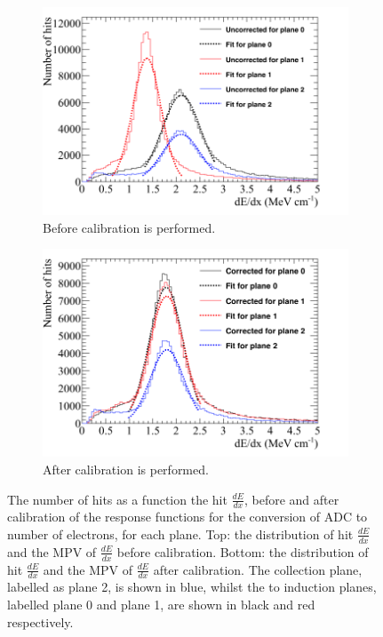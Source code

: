 \begin{figure}
  \centering
  \begin{subfigure}{0.6\textwidth}
    \centering
    \includegraphics[width=\textwidth]{UnCorrectedCanvas}
    \caption{Before calibration is performed.}
    \label{fig:CaloTune_Before}
  \end{subfigure}
  \begin{subfigure}{0.6\textwidth}
    \centering
    \includegraphics[width=\textwidth]{CorrectedCanvas}
    \caption{After calibration is performed.}
    \label{fig:CaloTune_After}
  \end{subfigure}
  \caption[The calibration of the calorimetric constants in the 35 ton]
          {The number of hits as a function the hit $\frac{dE}{dx}$, before and after calibration of the response functions for the conversion of ADC to number of electrons, for each plane. Top: the distribution of hit $\frac{dE}{dx}$ and the MPV of $\frac{dE}{dx}$ before calibration. Bottom: the distribution of hit $\frac{dE}{dx}$ and the MPV of $\frac{dE}{dx}$ after calibration. The collection plane, labelled as plane 2, is shown in blue, whilst the to induction planes, labelled plane 0 and plane 1, are shown in black and red respectively.}
          \label{fig:CaloTune}
\end{figure}
        
